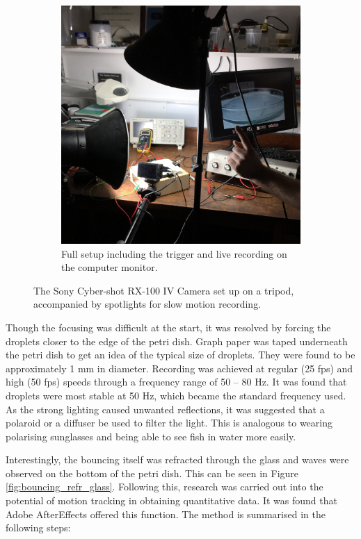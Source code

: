 \begin{figure}[ht]
\begin{subfigure}[t]{0.475\textwidth}
        \includegraphics[width=\textwidth]{prototype/exp_rep_imgs/slowmo_setup.jpg}
        \caption{Full setup including the trigger and live recording on the computer monitor.}
    \end{subfigure}
\caption{The Sony Cyber-shot RX-100 IV Camera set up on a tripod, accompanied by spotlights for slow motion recording. }
\label{fig:slowmo_setup}
\end{figure}

Though the focusing was difficult at the start, it was resolved by forcing the droplets closer to the edge of the petri dish. Graph paper was taped underneath the petri dish to get an idea of the typical size of droplets. They were found to be approximately 1 mm in diameter. Recording was achieved at regular (25 fps) and high (50 fps) speeds through a frequency range of 50 -- 80 Hz. It was found that droplets were most stable at 50 Hz, which became the standard frequency used. As the strong lighting caused unwanted reflections, it was suggested that a polaroid or a diffuser be used to filter the light. This is analogous to wearing polarising sunglasses and being able to see fish in water more easily.

Interestingly, the bouncing itself was refracted through the glass and waves were observed on the bottom of the petri dish. This can be seen in Figure \ref{fig:bouncing_refr_glass}. Following this, research was carried out into the potential of motion tracking in obtaining quantitative data. It was found that Adobe AfterEffects offered this function. The method is summarised in the following steps:

